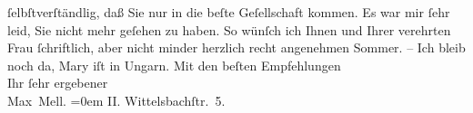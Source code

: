\begin{ledgroupsized}[t]{13cm}
                    ſelbſtverſtändlig, daß Sie nur in die beſte Geſellschaft kommen.\pend
           \pstart
           Es war mir ſehr leid, Sie nicht mehr geſehen zu haben. So wünſch ich Ihnen und
                    Ihrer verehrten Frau
                    ſchriftlich, aber nicht minder herzlich recht angenehmen Sommer. – Ich bleib
                    noch da, Mary iſt in Ungarn.\pend
           \pstart
           Mit den beſten Empfehlungen{\\[\baselineskip]}Ihr ſehr ergebener{\\[\baselineskip]}\spacefill\mbox{Max Mell.}\pend
           \leftskip=0em{}\pstart
           II. Wittelsbachſtr. 5.\pend
           \endnumbering{}\end{ledgroupsized}  \newcommand{\dateiname}{L01692}\newcommand{\titel}{Max Mell an Arthur Schnitzler, 15. 7. 1907}\newcommand{\editorInnen}{Martin Anton Müller und Gerd-Hermann Susen}
      